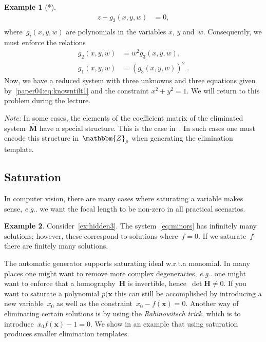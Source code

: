 \documentclass[11pt,a4paper]{article}
\makeatletter
\theoremstyle{definition}
\newtheorem{example}{Example}
\newcommand{\mat}[1]{\bm{#1}}
\newcommand{\Z}{\ensuremath{\mathbbm{Z}}}
\DeclareRobustCommand\eg{\emph{e.g}\@ifnextchar.{}{.\@}}
\makeatother
\begin{document}
\begin{example}[*]
\begin{equation}
\begin{aligned}
    z + g_3(x,y,w)  &=  0,\\
    \end{aligned}
\end{equation}
where~$g_i(x,y,w)$ are polynomials in the variables $x$, $y$ and~$w$.
Consequently, we must enforce the relations
\begin{equation}\label{paper04:eq:knowntilt1}
\begin{aligned}
    g_2(x,y,w) &= w^2 g_3(x,y,w), \\
    g_1(x,y,w) &= \left(g_3(x,y,w)\right)^2\;.
\end{aligned}
\end{equation}
Now, we have a reduced system with three unknowns and three equations given
by~\eqref{paper04:eq:knowntilt1} and the constraint $x^2+y^2=1$.
We will return to this problem during the lecture.

\end{example}

\emph{Note:} In some cases, the elements of the coefficient matrix of the eliminated system~$\hat{\mat{M}}$ have a special structure.
This is the case in~\cite{kukelova-etal-cvpr-2015,valtonenoernhag-springer-2021}. In such cases
one must encode this structure in~$\Z_p$ when generating the elimination template.

\subsection{Saturation}
In computer vision, there are many cases where saturating a variable makes sense, \eg{}
we want the focal length to be non-zero in all practical scenarios.

\begin{example}
Consider~\cref{ex:hidden3}. The system~\eqref{eq:minors} has infinitely many solutions; however,
these correspond to solutions where~$f=0$. If we saturate~$f$ there are finitely many solutions.
\end{example}

The automatic generator supports saturating ideal w.r.t.\@ a monomial. In many places one might
want to remove more complex degeneracies, \eg{} one might want to enforce that a homography~$\mat{H}$
is invertible, hence~$\det{\mat{H}}\neq 0$. If you want to saturate a polynomial $p(\mat{x}$ this
can still be accomplished by introducing a new
variable~$x_0$ as well as the constraint~$x_0-f(\mat{x}) = 0$.
Another way of eliminating certain solutions is by using the \emph{Rabinowitsch trick},
which is to introduce~$x_0f(\mat{x})-1 = 0$.
We show in an example that using saturation produces smaller elimination templates.
\end{document}
